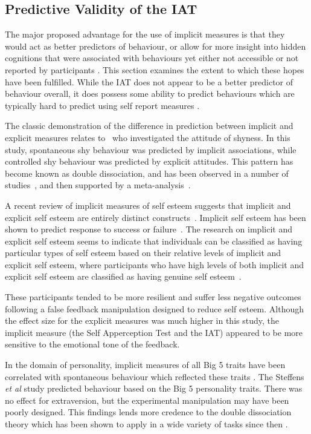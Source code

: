 \subsection{Predictive Validity of the IAT}
\label{sec:pred-valid-iat}


The major proposed advantage for the use of implicit measures is that they would act as better predictors of behaviour, or allow for more insight into hidden cognitions that were associated with behaviours yet either not accessible or not reported by participants \cite{Greenwald1998}. This section examines the extent to which these hopes have been fulfilled. While the IAT does not appear to be a better predictor of behaviour overall, it does possess some ability to predict behaviours which are typically hard to predict using self report measures \cite{Greenwald2009}. 

The classic demonstration of the difference in prediction between implicit and explicit measures relates to~\cite{Asendorpf2002} who investigated the attitude of shyness. In this study, spontaneous shy behaviour was predicted by implicit associations, while controlled shy behaviour was predicted by explicit attitudes. This pattern has become known as double dissociation, and has been observed in a number of studies~\cite{Perugini2005}, and  then supported by  a meta-analysis~\cite{Hofmann2005}. 

A recent review of implicit measures of self esteem suggests that implicit and explicit self esteem are entirely distinct constructs~\cite{Rudolph2008}. Implicit self esteem has been shown to predict response to success or failure~\cite{Greenwald2000}. 
The research on implicit and explicit self esteem seems to indicate that individuals can be classified as having particular types of self esteem based on their relative levels of implicit and explicit self esteem, where participants who have high levels of both implicit and explicit self esteem are classified as having genuine self esteem~\cite{Meagher2004}. 

These participants tended to be more resilient and suffer less negative outcomes following a false feedback manipulation designed to reduce self esteem. Although the effect size for the explicit measures was much higher in this study, the implicit measure (the Self Apperception Test and the IAT) appeared to be more sensitive to the emotional tone of the feedback. 


In the domain of personality, implicit measures of all Big 5 traits have been correlated with spontaneous behaviour which reflected these traits \cite{Steffens2006}. 
The Steffens \textit{et al} study predicted behaviour based on the Big 5 personality traits. There was no effect for extraversion, but the experimental manipulation may have been poorly designed. This findings lends more credence to the double dissociation theory \cite{Asendorpf2002} which has been shown to apply in a wide variety of tasks since then \cite{Perugini2005,Conner2005}. 

